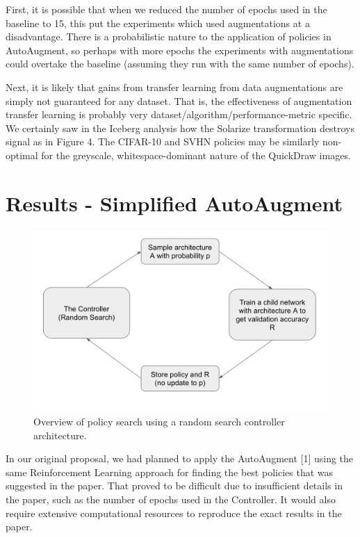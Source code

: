 \documentclass[10pt,twocolumn,letterpaper]{article}
\begin{document}
First, it is possible that when we reduced the number of epochs used in the baseline to 15, this put the experiments which used augmentations at a disadvantage. There is a probabilistic nature to the application of policies in AutoAugment, so perhaps with more epochs the experiments with augmentations could overtake the baseline (assuming they run with the same number of epochs).

Next, it is likely that gains from transfer learning from data augmentations are simply not guaranteed for any dataset.  That is, the effectiveness of augmentation transfer learning is probably very dataset/algorithm/performance-metric specific.  We certainly saw in the Iceberg analysis how the Solarize transformation destroys signal as in Figure 4.  The CIFAR-10 and SVHN policies may be similarly non-optimal for the greyscale, whitespace-dominant nature of the QuickDraw images.



\section{Results - Simplified AutoAugment}

\begin{figure}[bhp]
\includegraphics[width=\columnwidth]{random_search_arch.png}
\caption{Overview of policy search using a random search controller architecture.}
\end{figure}

In our original proposal, we had planned to apply the AutoAugment [1] using the same Reinforcement Learning approach for finding the best policies that was suggested in the paper.  That proved to be difficult due to insufficient details in the paper, such as the number of epochs used in the Controller.  It would also require extensive computational resources to reproduce the exact results in the paper.
\end{document}
